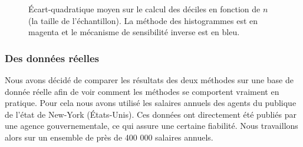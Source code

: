 \begin{figure}[H]
    \centering
    \hfill
    \hfill
    \caption{Écart-quadratique moyen sur le calcul des déciles en fonction de \(n\) (la taille de l'échantillon). La méthode des histogrammes est en {\color{magenta} magenta} et le mécanisme de sensibilité inverse est en {\color{blue} bleu}.}
\end{figure}




\subsubsection{Des données réelles}

Nous avons décidé de comparer les résultats des deux méthodes sur une base de donnée réelle \cite{salaries} afin de voir comment les méthodes se comportent vraiment en pratique. Pour cela nous avons utilisé les salaires annuels des agents du publique de l'état de New-York (États-Unis). Ces données ont directement été publiés par une agence gouvernementale, ce qui assure une certaine fiabilité. Nous travaillons alors sur un ensemble de près de 400 000 salaires annuels.


